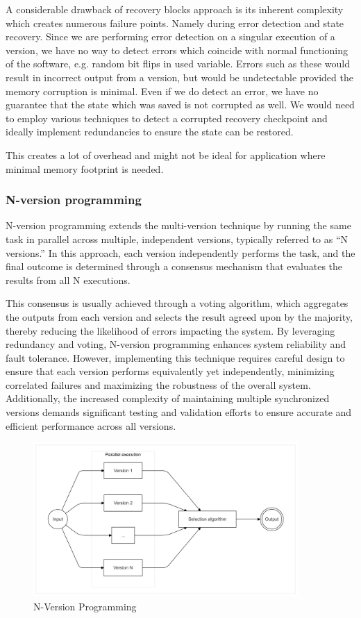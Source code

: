 \documentclass[12pt, letterpaper]{article}
\begin{document}
A considerable drawback of recovery blocks approach is its inherent complexity which creates numerous failure points. Namely during error detection and state recovery. Since we are performing error detection on a singular execution of a version, we have no way to detect errors which coincide with normal functioning of the software, e.g. random bit flips in used variable. Errors such as these would result in incorrect output from a version, but would be undetectable provided the memory corruption is minimal. Even if we do detect an error, we have no guarantee that the state which was saved is not corrupted as well. We would need to employ various techniques to detect a corrupted recovery checkpoint and ideally implement redundancies to ensure the state can be restored.

This creates a lot of overhead and might not be ideal for application where minimal memory footprint is needed.

\subsubsection{N-version programming}

N-version programming extends the multi-version technique by running the same task in parallel across multiple, independent versions, typically referred to as “N versions.” In this approach, each version independently performs the task, and the final outcome is determined through a consensus mechanism that evaluates the results from all N executions.

This consensus is usually achieved through a voting algorithm, which aggregates the outputs from each version and selects the result agreed upon by the majority, thereby reducing the likelihood of errors impacting the system. By leveraging redundancy and voting, N-version programming enhances system reliability and fault tolerance. However, implementing this technique requires careful design to ensure that each version performs equivalently yet independently, minimizing correlated failures and maximizing the robustness of the overall system. Additionally, the increased complexity of maintaining multiple synchronized versions demands significant testing and validation efforts to ensure accurate and efficient performance across all versions.

\begin{figure}[hbt!]
    \centering
    \includegraphics[width=0.9\textwidth]{n_version_prog/n_version_prog.png}
    \caption{N-Version Programming}
\end{figure}
\end{document}

